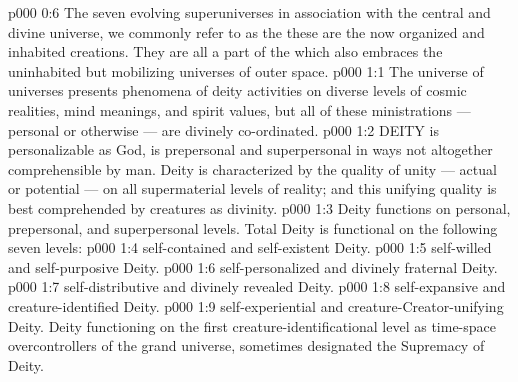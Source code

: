 \vs p000 0:6 The seven evolving superuniverses in association with the central and divine universe, we commonly refer to as the  these are the now organized and inhabited creations. They are all a part of the  which also embraces the uninhabited but mobilizing universes of outer space.
\vs p000 1:1 The universe of universes presents phenomena of deity activities on diverse levels of cosmic realities, mind meanings, and spirit values, but all of these ministrations --- personal or otherwise --- are divinely co\hyp{}ordinated.
\vs p000 1:2 \pc DEITY is personalizable as God, is prepersonal and superpersonal in ways not altogether comprehensible by man. Deity is characterized by the quality of unity --- actual or potential --- on all supermaterial levels of reality; and this unifying quality is best comprehended by creatures as divinity.
\vs p000 1:3 \pc Deity functions on personal, prepersonal, and superpersonal levels. Total Deity is functional on the following seven levels:
\vs p000 1:4 \bibnobreakspace {} self\hyp{}contained and self\hyp{}existent Deity.
\vs p000 1:5 \bibnobreakspace {} self\hyp{}willed and self\hyp{}purposive Deity.
\vs p000 1:6 \bibnobreakspace {} self\hyp{}personalized and divinely fraternal Deity.
\vs p000 1:7 \bibnobreakspace {} self\hyp{}distributive and divinely revealed Deity.
\vs p000 1:8 \bibnobreakspace {} self\hyp{}expansive and creature\hyp{}identified Deity.
\vs p000 1:9 \bibnobreakspace {} self\hyp{}experiential and creature\hyp{}Creator\hyp{}unifying Deity. Deity functioning on the first creature\hyp{}identificational level as time\hyp{}space overcontrollers of the grand universe, sometimes designated the Supremacy of Deity.
